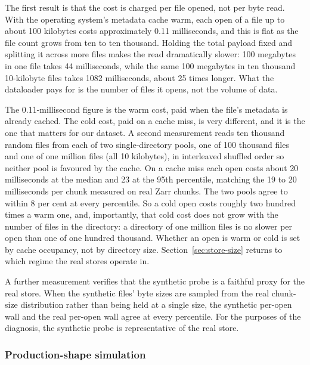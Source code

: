 \documentclass[12pt,a4paper]{article}
\begin{document}
The first result is that the cost is charged per file opened, not per byte read. With the
operating system's metadata cache warm, each open of a file up to about 100 kilobytes costs
approximately 0.11 milliseconds, and this is flat as the file count grows from ten to ten
thousand. Holding the total payload fixed and splitting it across more files makes the read
dramatically slower: 100 megabytes in one file takes 44 milliseconds, while the same 100
megabytes in ten thousand 10-kilobyte files takes 1082 milliseconds, about 25 times longer.
What the dataloader pays for is the number of files it opens, not the volume of data.

The 0.11-millisecond figure is the warm cost, paid when the file's metadata is already
cached. The cold cost, paid on a cache miss, is very different, and it is the one that
matters for our dataset. A second measurement reads ten thousand random files from each of
two single-directory pools, one of 100 thousand files and one of one million files (all 10
kilobytes), in interleaved shuffled order so neither pool is favoured by the cache. On a
cache miss each open costs about 20 milliseconds at the median and 23 at the 95th
percentile, matching the 19 to 20 milliseconds per chunk measured on real Zarr chunks. The
two pools agree to within 8 per cent at every percentile. So a cold open costs roughly two
hundred times a warm one, and, importantly, that cold cost does not grow with the number of
files in the directory: a directory of one million files is no slower per open than one of
one hundred thousand. Whether an open is warm or cold is set by cache occupancy, not by
directory size. Section~\ref{sec:store-size} returns to which regime the real stores operate
in.

A further measurement verifies that the synthetic probe is a faithful proxy for the real
store. When the synthetic files' byte sizes are sampled from the real chunk-size
distribution rather than being held at a single size, the synthetic per-open wall and the
real per-open wall agree at every percentile. For the purposes of the diagnosis, the
synthetic probe is representative of the real store.

\subsubsection{Production-shape simulation}
\end{document}
